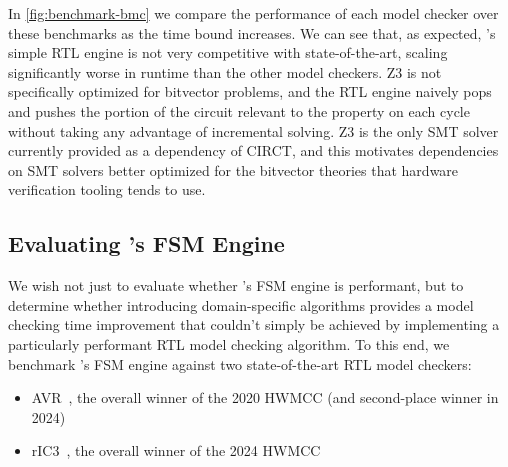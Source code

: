 \documentclass[acmsmall,screen,review]{acmart}
\begin{document}
In \autoref{fig:benchmark-bmc} we compare the performance of each model checker over these benchmarks as the time bound increases.
We can see that, as expected, \toolname{}'s simple RTL engine is not very competitive with state-of-the-art, scaling significantly worse in runtime than the other model checkers.
Z3 is not specifically optimized for bitvector problems, and the RTL engine naively pops and pushes the portion of the circuit relevant to the property on each cycle without taking any advantage of incremental solving.
Z3 is the only SMT solver currently provided as a dependency of CIRCT, and this motivates dependencies on SMT solvers better optimized for the bitvector theories that hardware verification tooling tends to use.

\newpage
\subsection{Evaluating \toolname{}'s FSM Engine}

We wish not just to evaluate whether \toolname{}'s FSM engine is performant, but to determine whether introducing domain-specific algorithms provides a model checking time improvement that couldn't simply be achieved by implementing a particularly performant RTL model checking algorithm.
To this end, we benchmark \toolname{}'s FSM engine against two state-of-the-art RTL model checkers:

\begin{itemize}
  \item{AVR~\cite{avr}, the overall winner of the 2020 HWMCC (and second-place winner in 2024)}
  \item{rIC3~\cite{ric3}, the overall winner of the 2024 HWMCC}
\end{itemize}
\end{document}
